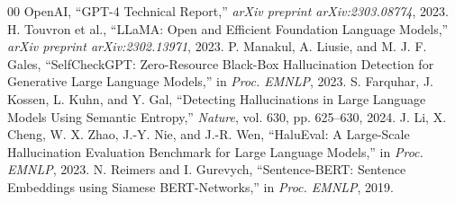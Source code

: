 \documentclass[conference]{IEEEtran}
\begin{document}
\begin{thebibliography}{00}
 OpenAI, ``GPT-4 Technical Report,'' \textit{arXiv preprint arXiv:2303.08774}, 2023.
 H. Touvron et al., ``LLaMA: Open and Efficient Foundation Language Models,'' \textit{arXiv preprint arXiv:2302.13971}, 2023.
 P. Manakul, A. Liusie, and M. J. F. Gales, ``SelfCheckGPT: Zero-Resource Black-Box Hallucination Detection for Generative Large Language Models,'' in \textit{Proc. EMNLP}, 2023.
 S. Farquhar, J. Kossen, L. Kuhn, and Y. Gal, ``Detecting Hallucinations in Large Language Models Using Semantic Entropy,'' \textit{Nature}, vol. 630, pp. 625–630, 2024.
 J. Li, X. Cheng, W. X. Zhao, J.-Y. Nie, and J.-R. Wen, ``HaluEval: A Large-Scale Hallucination Evaluation Benchmark for Large Language Models,'' in \textit{Proc. EMNLP}, 2023.
 N. Reimers and I. Gurevych, ``Sentence-BERT: Sentence Embeddings using Siamese BERT-Networks,'' in \textit{Proc. EMNLP}, 2019.
\end{thebibliography}
\end{document}
